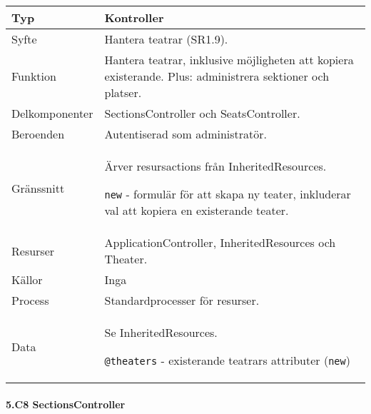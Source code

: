 \documentclass[a4paper, twoside, 11pt, titlepage]{article}
\begin{document}
			\begin {table} [ht] \begin{tabular} {  p{3.5cm} p{9.6cm} }
				\hline
				{Typ} & {Kontroller} \\
				\hline
				{Syfte} & {Hantera teatrar (SR1.9).} \\
				\hline
				{Funktion} & {Hantera teatrar, inklusive möjligheten att kopiera existerande. Plus: administrera sektioner och platser.} \\
				\hline
				{Delkomponenter} & {SectionsController och SeatsController.} \\
				\hline
				{Beroenden} & {Autentiserad som administratör.} \\
				\hline
				{Gränssnitt} & {Ärver resursactions från InheritedResources.

{\tt new} - formulär för att skapa ny teater, inkluderar val att kopiera en existerande teater.} \\
				\hline
				{Resurser} & {ApplicationController, InheritedResources och Theater.} \\
				\hline
				{Källor} & {Inga} \\
				\hline
				{Process} & {Standardprocesser för resurser.} \\
				\hline
				{Data} & {Se InheritedResources.

{\tt @theaters} - existerande teatrars attributer ({\tt new})} \\
				\hline
			\end{tabular} \end{table} \FloatBarrier


			\paragraph{5.C8 SectionsController}\
\end{document}
